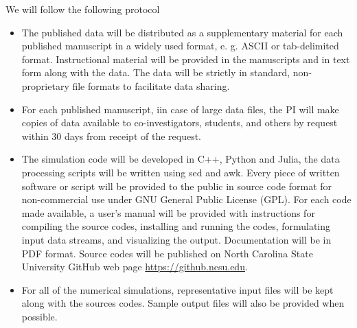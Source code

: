 
We will follow the following protocol 
\begin{itemize}

	\item 
The published data will be distributed as a supplementary  material for each 
published manuscript in a widely used format, e. g. 
ASCII or tab-delimited  format. 
Instructional material will be provided in 
the manuscripts and in text form along  with the data. 
The data will be strictly in standard, non-proprietary file formats 
to facilitate  data sharing. 

\item 
For each published manuscript, iin case of large data files, 
the PI will make copies of data 
available to co-investigators, students, and
others by request within 30 days from receipt of the request. 
 


	\item
The simulation code will be developed in C++, Python and Julia, 
the data processing  scripts will be written using sed and awk. 
Every piece of written software or script will 
be provided to the public in source code format for non-commercial use 
under GNU General Public License (GPL). 
For each code made available, a user's manual will be provided with
instructions for compiling the source codes, installing and running the codes,
formulating input data streams, and visualizing the output. Documentation will
be in PDF format.
Source codes will be published on North Carolina State University 
	GitHub web page \url{https://github.ncsu.edu}. 

\item 
For all of the numerical simulations, representative input files will
be kept along with the sources codes. Sample  output files 
will also be provided when possible. 

\end{itemize}

